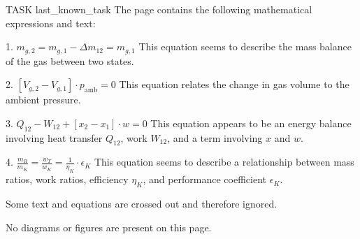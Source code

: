 TASK {last_known_task}  
The page contains the following mathematical expressions and text:

1. \( m_{g,2} = m_{g,1} - \Delta m_{12} = m_{g,1} \)  
   This equation seems to describe the mass balance of the gas between two states.

2. \( [V_{g,2} - V_{g,1}] \cdot p_{\text{amb}} = 0 \)  
   This equation relates the change in gas volume to the ambient pressure.

3. \( Q_{12} - W_{12} + [x_{2} - x_{1}] \cdot w = 0 \)  
   This equation appears to be an energy balance involving heat transfer \( Q_{12} \), work \( W_{12} \), and a term involving \( x \) and \( w \).

4. \( \frac{m_{R}}{m_{K}} = \frac{w_{T}}{w_{K}} = \frac{1}{\eta_{K}} \cdot \epsilon_{K} \)  
   This equation seems to describe a relationship between mass ratios, work ratios, efficiency \( \eta_{K} \), and performance coefficient \( \epsilon_{K} \).

Some text and equations are crossed out and therefore ignored.

No diagrams or figures are present on this page.